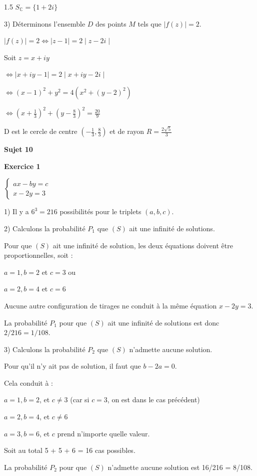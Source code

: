 \documentclass[12pt]{article}
\begin{document}
\begin{spacing}{1.5}
$S_{\mathbb{C}}=\{1+2i\}$

3) Déterminons l'ensemble $D$ des points $M$ tels que $\mid f(z) \mid = 2$.

$\mid f(z) \mid = 2\Leftrightarrow \mid z-1\mid=2\mid z-2i\mid$

Soit $z=x+iy$

$\Leftrightarrow \mid x+iy-1\mid=2\mid x+iy-2i\mid$

$\Leftrightarrow (x-1)^2+y^2=4(x^2+(y-2)^2)$

$\Leftrightarrow (x+\frac{1}{3})^2+(y-\frac{8}{3})^2=\frac{20}{9}$

D est le cercle de centre $(-\frac{1}{3},\frac{8}{3})$ et de rayon $R=\frac{2\sqrt{5}}{3}$


\medskip\textbf{Sujet 10}

\textbf{Exercice 1}

$\begin{cases}
ax-by=c\\
x-2y=3
\end{cases}$

1) Il y a $6^3=216$ possibilités pour le triplets $(a,b,c)$.

2) Calculons la probabilité $P_1$ que $(S)$ ait une infinité de solutions.

Pour que $(S)$ ait une infinité de solution, les deux équations doivent être proportionnelles, soit : 

$a = 1, b = 2$ et $c = 3$ ou 

$a = 2, b = 4$ et $c = 6$  

Aucune autre configuration de tirages ne conduit à la même équation $x-2y = 3$. 

La probabilité $P_1$ pour que $(S)$ ait une infinité de solutions est donc $2/216 = 1/108$. 

3) Calculons la probabilité $P_2$ que $(S)$ n'admette aucune solution. 

Pour qu'il n'y ait pas de solution, il faut que $b-2a = 0$. 

Cela conduit à : 

$a = 1, b = 2$, et $c\neq 3$ (car si $c = 3$, on est dans le cas précédent) 

$a = 2, b = 4$, et $c\neq 6$ 

$a = 3, b = 6$, et $c$ prend n'importe quelle valeur. 

Soit au total 5 + 5 + 6 = 16 cas possibles. 

La probabilité $P_2$ pour que $(S)$ n'admette aucune solution est 16/216 = 8/108. 


\end{spacing}
\end{document}
